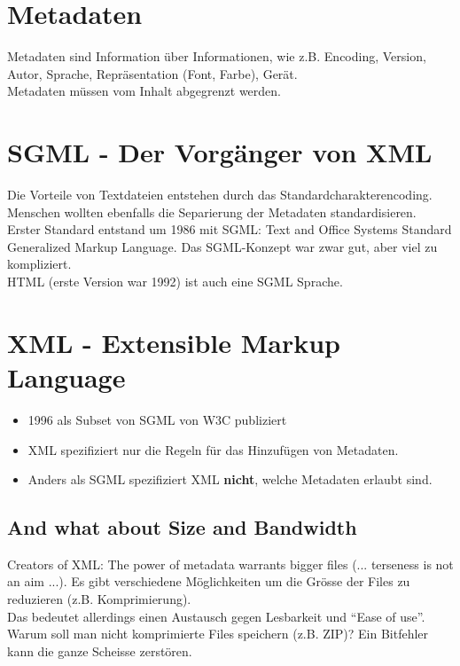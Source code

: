 \section{Metadaten}
Metadaten sind Information über Informationen, wie z.B. Encoding, Version, Autor, Sprache, Repräsentation (Font, Farbe), Gerät.\\
Metadaten müssen vom Inhalt abgegrenzt werden.

\section{SGML - Der Vorgänger von XML}
Die Vorteile von Textdateien entstehen durch das Standardcharakterencoding.\\
Menschen wollten ebenfalls die Separierung der Metadaten standardisieren.\\
Erster Standard entstand um 1986 mit SGML: Text and Office Systems Standard Generalized Markup Language. Das SGML-Konzept war zwar gut, aber viel zu kompliziert.\\
HTML (erste Version war 1992) ist auch eine SGML Sprache.

\section{XML - Extensible Markup Language}
\begin{itemize}
\item 1996 als Subset von SGML von W3C publiziert
\item XML spezifiziert nur die Regeln für das Hinzufügen von Metadaten.
\item Anders als SGML spezifiziert XML \textbf{nicht}, welche Metadaten erlaubt sind.
\end{itemize}

\subsection{And what about Size and Bandwidth}
Creators of XML: The power of metadata warrants bigger files (... terseness is not an aim ...).
Es gibt verschiedene Möglichkeiten um die Grösse der Files zu reduzieren (z.B. Komprimierung).\\
Das bedeutet allerdings einen Austausch gegen Lesbarkeit und "`Ease of use"'.\\
Warum soll man nicht komprimierte Files speichern (z.B. ZIP)? Ein Bitfehler kann die ganze Scheisse zerstören.

